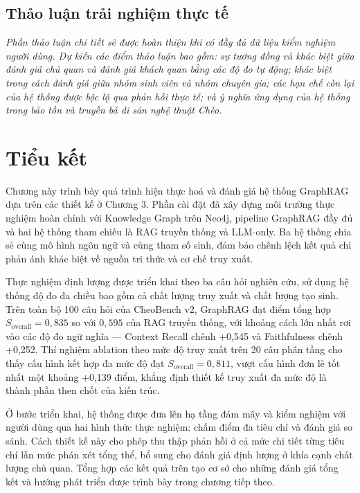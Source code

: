 
\subsection{Thảo luận trải nghiệm thực tế}

\textit{Phần thảo luận chi tiết sẽ được hoàn thiện khi có đầy đủ dữ liệu kiểm nghiệm người dùng. Dự kiến các điểm thảo luận bao gồm: sự tương đồng và khác biệt giữa đánh giá chủ quan và đánh giá khách quan bằng các độ đo tự động; khác biệt trong cách đánh giá giữa nhóm sinh viên và nhóm chuyên gia; các hạn chế còn lại của hệ thống được bộc lộ qua phản hồi thực tế; và ý nghĩa ứng dụng của hệ thống trong bảo tồn và truyền bá di sản nghệ thuật Chèo.}

\section*{Tiểu kết}

Chương này trình bày quá trình hiện thực hoá và đánh giá hệ thống GraphRAG dựa trên các thiết kế ở Chương 3. Phần cài đặt đã xây dựng môi trường thực nghiệm hoàn chỉnh với Knowledge Graph trên Neo4j, pipeline GraphRAG đầy đủ và hai hệ thống tham chiếu là RAG truyền thống và LLM-only. Ba hệ thống chia sẻ cùng mô hình ngôn ngữ và cùng tham số sinh, đảm bảo chênh lệch kết quả chỉ phản ánh khác biệt về nguồn tri thức và cơ chế truy xuất.

Thực nghiệm định lượng được triển khai theo ba câu hỏi nghiên cứu, sử dụng hệ thống độ đo đa chiều bao gồm cả chất lượng truy xuất và chất lượng tạo sinh. Trên toàn bộ 100 câu hỏi của CheoBench v2, GraphRAG đạt điểm tổng hợp $S_{\text{overall}} = 0{,}835$ so với $0{,}595$ của RAG truyền thống, với khoảng cách lớn nhất rơi vào các độ đo ngữ nghĩa --- Context Recall chênh +0,545 và Faithfulness chênh +0,252. Thí nghiệm ablation theo mức độ truy xuất trên 20 câu phân tầng cho thấy cấu hình kết hợp đa mức độ đạt $S_{\text{overall}} = 0{,}811$, vượt cấu hình đơn lẻ tốt nhất một khoảng +0,139 điểm, khẳng định thiết kế truy xuất đa mức độ là thành phần then chốt của kiến trúc.

Ở bước triển khai, hệ thống được đưa lên hạ tầng đám mây và kiểm nghiệm với người dùng qua hai hình thức thực nghiệm: chấm điểm đa tiêu chí và đánh giá so sánh. Cách thiết kế này cho phép thu thập phản hồi ở cả mức chi tiết từng tiêu chí lẫn mức phán xét tổng thể, bổ sung cho đánh giá định lượng ở khía cạnh chất lượng chủ quan. Tổng hợp các kết quả trên tạo cơ sở cho những đánh giá tổng kết và hướng phát triển được trình bày trong chương tiếp theo.
